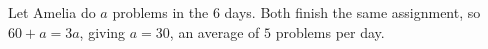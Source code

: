 Let Amelia do $a$ problems in the $6$ days. Both finish the same assignment, so $60+a=3a$, giving $a=30$, an average of $\boxed{5}$ problems per day.
